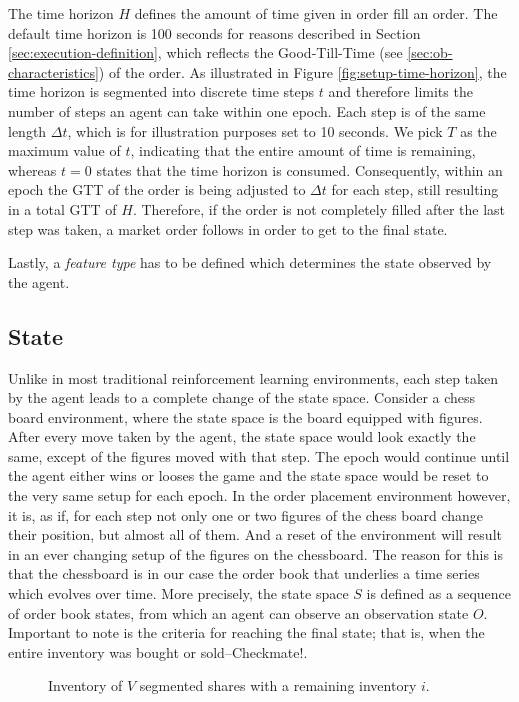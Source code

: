 The time horizon $H$ defines the amount of time given in order fill an order.
The default time horizon is 100 seconds for reasons described in Section \ref{sec:execution-definition}, which reflects the Good-Till-Time (see \ref{sec:ob-characteristics}) of the order.
As illustrated in Figure \ref{fig:setup-time-horizon}, the time horizon is segmented into discrete time steps $t$ and therefore limits the number of steps an agent can take within one epoch.
Each step is of the same length $\Delta{t}$, which is for illustration purposes set to 10 seconds.
We pick $T$ as the maximum value of $t$, indicating that the entire amount of time is remaining, whereas $t=0$ states that the time horizon is consumed.
Consequently, within an epoch the GTT of the order is being adjusted to $\Delta{t}$ for each step, still resulting in a total GTT of $H$.
Therefore, if the order is not completely filled after the last step was taken, a market order follows in order to get to the final state.

Lastly, a \textit{feature type} has to be defined which determines the state observed by the agent.

\subsection{State}
Unlike in most traditional reinforcement learning environments, each step taken by the agent leads to a complete change of the state space.
Consider a chess board environment, where the state space is the board equipped with figures. 
After every move taken by the agent, the state space would look exactly the same, except of the figures moved with that step.
The epoch would continue until the agent either wins or looses the game and the state space would be reset to the very same setup for each epoch.
In the order placement environment however, it is, as if, for each step not only one or two figures of the chess board change their position, but almost all of them.
And a reset of the environment will result in an ever changing setup of the figures on the chessboard.
The reason for this is that the chessboard is in our case the order book that underlies a time series which evolves over time.
More precisely, the state space $S$ is defined as a sequence of order book states, from which an agent can observe an observation state $O$.
Important to note is the criteria for reaching the final state; that is, when the entire inventory was bought or sold--Checkmate!.

\begin{figure}[H]
    \centering
    \caption{Inventory of $V$ segmented shares with a remaining inventory $i$.}
    \label{fig:setup-inventory}
\end{figure}

